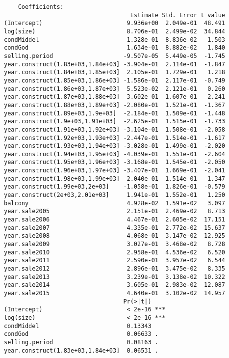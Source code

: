 \begin{lstlisting}
    Coefficients:
                                    Estimate Std. Error t value
(Intercept)                        9.936e+00  2.049e-01  48.491
log(size)                          8.706e-01  2.499e-02  34.844
condMiddel                         1.328e-01  8.836e-02   1.503
condGod                            1.634e-01  8.882e-02   1.840
selling.period                    -9.507e-05  5.449e-05  -1.745
year.construct(1.83e+03,1.84e+03] -3.904e-01  2.114e-01  -1.847
year.construct(1.84e+03,1.85e+03]  2.105e-01  1.729e-01   1.218
year.construct(1.85e+03,1.86e+03] -1.586e-01  2.117e-01  -0.749
year.construct(1.86e+03,1.87e+03]  5.523e-02  2.121e-01   0.260
year.construct(1.87e+03,1.88e+03] -3.602e-01  1.607e-01  -2.241
year.construct(1.88e+03,1.89e+03] -2.080e-01  1.521e-01  -1.367
year.construct(1.89e+03,1.9e+03]  -2.184e-01  1.509e-01  -1.448
year.construct(1.9e+03,1.91e+03]  -2.625e-01  1.515e-01  -1.733
year.construct(1.91e+03,1.92e+03] -3.104e-01  1.508e-01  -2.058
year.construct(1.92e+03,1.93e+03] -2.447e-01  1.514e-01  -1.617
year.construct(1.93e+03,1.94e+03] -3.028e-01  1.499e-01  -2.020
year.construct(1.94e+03,1.95e+03] -4.039e-01  1.551e-01  -2.604
year.construct(1.95e+03,1.96e+03] -3.168e-01  1.545e-01  -2.050
year.construct(1.96e+03,1.97e+03] -3.407e-01  1.669e-01  -2.041
year.construct(1.98e+03,1.99e+03] -2.040e-01  1.514e-01  -1.347
year.construct(1.99e+03,2e+03]    -1.058e-01  1.826e-01  -0.579
year.construct(2e+03,2.01e+03]     1.941e-01  1.552e-01   1.250
balcony                            4.928e-02  1.591e-02   3.097
year.sale2005                      2.151e-01  2.469e-02   8.713
year.sale2006                      4.467e-01  2.605e-02  17.151
year.sale2007                      4.335e-01  2.772e-02  15.637
year.sale2008                      4.068e-01  3.147e-02  12.925
year.sale2009                      3.027e-01  3.468e-02   8.728
year.sale2010                      2.958e-01  4.536e-02   6.520
year.sale2011                      2.590e-01  3.957e-02   6.544
year.sale2012                      2.896e-01  3.475e-02   8.335
year.sale2013                      3.239e-01  3.138e-02  10.322
year.sale2014                      3.605e-01  2.983e-02  12.087
year.sale2015                      4.640e-01  3.102e-02  14.957
                                  Pr(>|t|)    
(Intercept)                        < 2e-16 ***
log(size)                          < 2e-16 ***
condMiddel                         0.13343    
condGod                            0.06633 .  
selling.period                     0.08163 .  
year.construct(1.83e+03,1.84e+03]  0.06531 .  

\end{lstlisting}
